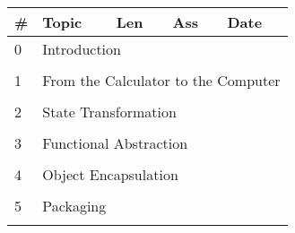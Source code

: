 \documentclass[a4paper,12pt]{article} %
\begin{document}
\begin{longtable}{|l|p{11cm}|l|l|l|}
	\hline
	\# & Topic & Len & Ass & Date \\
	\hline
	0 & \multicolumn{4}{|l|}{Introduction}\\
	\hline
	& & & &  \\
	\hline
	1 & \multicolumn{4}{|l|}{From the Calculator to the Computer}\\
	\hline
	& & & &  \\
	\hline
	2 & \multicolumn{4}{|l|}{State Transformation}\\
	\hline
	& & & &  \\
	\hline
	3 & \multicolumn{4}{|l|}{Functional Abstraction}\\
	\hline
	& & & &  \\
	\hline
	4 & \multicolumn{4}{|l|}{Object Encapsulation}\\
	\hline
	& & & &  \\
	\hline
	5 & \multicolumn{4}{|l|}{Packaging}\\
	\hline
	& & & &  \\
	\hline
\end{longtable}

\end{document}
